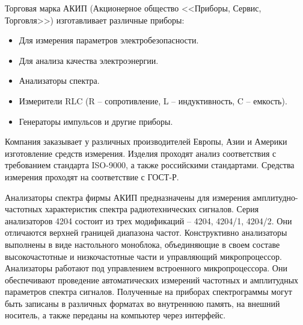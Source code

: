 Торговая марка АКИП (Акционерное общество <<Приборы, Сервис, Торговля>>) изготавливает различные приборы\cite{prist}: 

\begin{itemize}
	\item Для измерения параметров электробезопасности.
	\item Для анализа качества электроэнергии.
	\item Анализаторы спектра.
	\item Измерители RLC (R -- сопротивление, L -- индуктивность, C -- емкость).
	\item Генераторы импульсов и другие приборы.
\end{itemize}

Компания заказывает у различных производителей Европы, Азии и Америки изготовление средств измерения. Изделия проходят анализ соответствия с требованием стандарта ISO-9000, а также российскими стандартами. Средства измерения проходят на соответствие с ГОСТ-Р. 

Анализаторы спектра фирмы АКИП предназначены для измерения амплитудно-частотных характеристик спектра радиотехнических сигналов. Серия анализаторов 4204 состоит из трех модификаций – 4204, 4204/1, 4204/2. Они отличаются верхней границей диапазона частот. Конструктивно анализаторы выполнены в виде настольного моноблока, объединяющие в своем составе высокочастотные и низкочастотные части и управляющий микропроцессор. Анализаторы работают под управлением встроенного микропроцессора. Они обеспечивают проведение автоматических измерений частотных и амплитудных параметров спектра сигналов. Полученные на приборах спектрограммы могут быть записаны в различных форматах во внутреннюю память, на внешний носитель, а также переданы на компьютер через интерфейс. 


